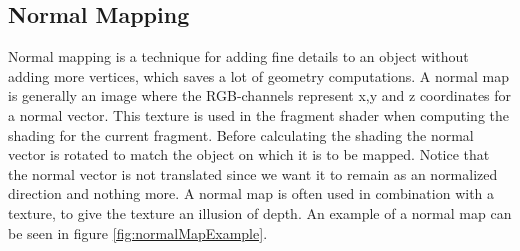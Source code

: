 \newpage
\subsection{Normal Mapping}
Normal mapping is a technique for adding fine details to an object without adding more vertices, which saves a lot of geometry computations. A normal map is generally an image where the RGB-channels represent x,y and z coordinates for a normal vector. This texture is used in the fragment shader when computing the shading for the current fragment. Before calculating the shading the normal vector is rotated to match the object on which it is to be mapped. Notice that the normal vector is not translated since we want it to remain as an normalized direction and nothing more. A normal map is often used in combination with a texture, to give the texture an illusion of depth. An example of a normal map can be seen in figure \ref{fig:normalMapExample}.
